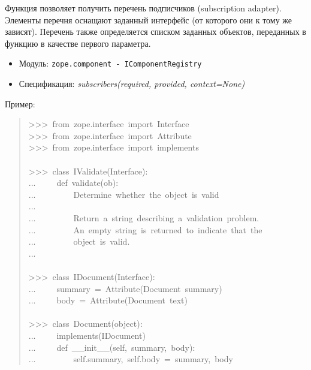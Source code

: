 \documentclass[a4paper,openany,twoside,final]{book}
\providecommand*{\DUroletitlereference}[1]{\textsl{#1}}
\begin{document}
Функция позволяет получить перечень подписчиков (subscription
adapter).  Элементы перечня оснащают заданный интерфейс (от которого
они к тому же зависят).  Перечень также определяется списком заданных
объектов, переданных в функцию в качестве первого параметра.

\begin{itemize}

\item Модуль: \texttt{zope.component - IComponentRegistry}

\item Спецификация: \DUroletitlereference{subscribers(required, provided, context=None)}

\end{itemize}

Пример:

\begin{quote}{\ttfamily \raggedright \noindent
>{}>{}>~from~zope.interface~import~Interface\\
>{}>{}>~from~zope.interface~import~Attribute\\
>{}>{}>~from~zope.interface~import~implements\\
~\\
>{}>{}>~class~IValidate(Interface):\\
...~~~~~def~validate(ob):\\
...~~~~~~~~~\textquotedbl{}\textquotedbl{}\textquotedbl{}Determine~whether~the~object~is~valid\\
...\\
...~~~~~~~~~Return~a~string~describing~a~validation~problem.\\
...~~~~~~~~~An~empty~string~is~returned~to~indicate~that~the\\
...~~~~~~~~~object~is~valid.\\
...~~~~~~~~~\textquotedbl{}\textquotedbl{}\textquotedbl{}\\
~\\
>{}>{}>~class~IDocument(Interface):\\
...~~~~~summary~=~Attribute(\textquotedbl{}Document~summary\textquotedbl{})\\
...~~~~~body~=~Attribute(\textquotedbl{}Document~text\textquotedbl{})\\
~\\
>{}>{}>~class~Document(object):\\
...~~~~~implements(IDocument)\\
...~~~~~def~\_\_init\_\_(self,~summary,~body):\\
...~~~~~~~~~self.summary,~self.body~=~summary,~body\\
}
\end{quote}
\end{document}
